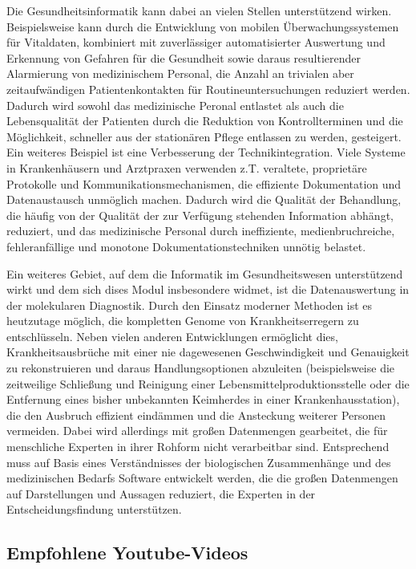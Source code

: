Die Gesundheitsinformatik kann dabei an vielen Stellen unterstützend wirken. Beispielsweise kann durch die Entwicklung von mobilen Überwachungssystemen für Vitaldaten, kombiniert mit zuverlässiger automatisierter Auswertung und Erkennung von Gefahren für die Gesundheit sowie daraus resultierender Alarmierung von medizinischem Personal, die Anzahl an trivialen aber zeitaufwändigen Patientenkontakten für Routineuntersuchungen reduziert werden. Dadurch wird sowohl das medizinische Peronal entlastet als auch die Lebensqualität der Patienten durch die Reduktion von Kontrollterminen und die Möglichkeit, schneller aus der stationären Pflege entlassen zu werden, gesteigert. Ein weiteres Beispiel ist eine Verbesserung der Technikintegration. Viele Systeme in Krankenhäusern und Arztpraxen verwenden z.T. veraltete, proprietäre Protokolle und Kommunikationsmechanismen, die effiziente Dokumentation und Datenaustausch unmöglich machen. Dadurch wird die Qualität der Behandlung, die häufig von der Qualität der zur Verfügung stehenden Information abhängt, reduziert, und das medizinische Personal durch ineffiziente, medienbruchreiche, fehleranfällige und monotone Dokumentationstechniken unnötig belastet.

Ein weiteres Gebiet, auf dem die Informatik im Gesundheitswesen unterstützend wirkt und dem sich dises Modul insbesondere widmet, ist die Datenauswertung in der molekularen Diagnostik. Durch den Einsatz moderner Methoden ist es heutzutage möglich, die kompletten Genome von Krankheitserregern zu entschlüsseln. Neben vielen anderen Entwicklungen ermöglicht dies, Krankheitsausbrüche mit einer nie dagewesenen Geschwindigkeit und Genauigkeit zu rekonstruieren und daraus Handlungsoptionen abzuleiten (beispielsweise die zeitweilige Schließung und Reinigung einer Lebensmittelproduktionsstelle oder die Entfernung eines bisher unbekannten Keimherdes in einer Krankenhausstation), die den Ausbruch effizient eindämmen und die Ansteckung weiterer Personen vermeiden. Dabei wird allerdings mit großen Datenmengen gearbeitet, die für menschliche Experten in ihrer Rohform nicht verarbeitbar sind. Entsprechend muss auf Basis eines Verständnisses der biologischen Zusammenhänge und des medizinischen Bedarfs Software entwickelt werden, die die großen Datenmengen auf Darstellungen und Aussagen reduziert, die Experten in der Entscheidungsfindung unterstützen. 


\subsection{Empfohlene Youtube-Videos}

